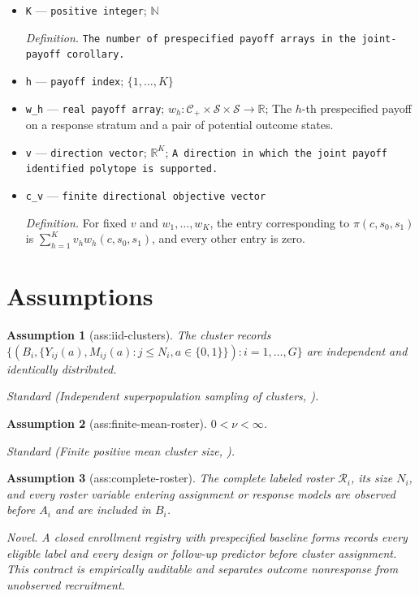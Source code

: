 \documentclass{article}
\newtheorem{assumption}{Assumption}
\begin{document}
\begin{itemize}
  \item \texttt{K} --- \texttt{positive integer}; \(\mathbb N\)
  \par\smallskip\noindent\emph{Definition.} \texttt{The number of prespecified payoff arrays in the joint-\allowbreak{}payoff corollary.}
  \item \texttt{h} --- \texttt{payoff index}; \(\{1,\ldots,K\}\)
  \item \texttt{w\_\allowbreak{}h} --- \texttt{real payoff array}; \(w_h:\mathcal C_{+}\times\mathcal S\times\mathcal S\to\mathbb R\); The \(h\)-th prespecified payoff on a response stratum and a pair of potential outcome states.
  \item \texttt{v} --- \texttt{direction vector}; \(\mathbb R^K\); \texttt{A direction in which the joint payoff identified polytope is supported.}
  \item \texttt{c\_\allowbreak{}v} --- \texttt{finite directional objective vector}
  \par\smallskip\noindent\emph{Definition.} For fixed \(v\) and \(w_1,\ldots,w_K\), the entry corresponding to \(\pi(c,s_0,s_1)\) is \(\sum_{h=1}^K v_h w_h(c,s_0,s_1)\), and every other entry is zero.
\end{itemize}

\section{Assumptions}

\begin{assumption}[ass:iid-clusters]\label{ass:iid-clusters}
The cluster records \(\{(B_i,\{Y_{ij}(a),M_{ij}(a):j\le N_i,a\in\{0,1\}\}) : i=1,\ldots,G\}\) are independent and identically distributed.
\par\smallskip\noindent\emph{Standard} (Independent superpopulation sampling of clusters, \cite{WangParkSmallLi2024}).
\end{assumption}

\begin{assumption}[ass:finite-mean-roster]\label{ass:finite-mean-roster}
\(0<\nu<\infty\).
\par\smallskip\noindent\emph{Standard} (Finite positive mean cluster size, \cite{WangLiWang2026}).
\end{assumption}

\begin{assumption}[ass:complete-roster]\label{ass:complete-roster}
The complete labeled roster \(\mathcal R_i\), its size \(N_i\), and every roster variable entering assignment or response models are observed before \(A_i\) and are included in \(B_i\).
\par\smallskip\noindent\emph{Novel.} A closed enrollment registry with prespecified baseline forms records every eligible label and every design or follow-up predictor before cluster assignment. This contract is empirically auditable and separates outcome nonresponse from unobserved recruitment.
\end{assumption}
\end{document}
